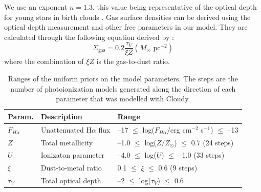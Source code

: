 \documentclass[fleqn,usenatbib]{mnras}
\begin{document}
We use an exponent $n = 1.3$, this value being representative of the optical depth for young stars in birth clouds \citep{dacunha2008}. Gas surface densities can be derived using the optical depth measurement and other free parameters in our model. They are calculated through the following equation derived by \cite{brinchmann2013}: 
\begin{equation}
    \label{eq:gas_equation_brinchmann}
    \Sigma_{\textrm{gas}} = 0.2 \frac{\tau_{V}}{\xi Z} (M_{\odot}\textrm{ pc}^{-2})
\end{equation}
where the combination of $\xi Z$ is the gas-to-dust ratio.
\begin{table}
 \centering
 \caption{Ranges of the uniform priors on the model parameters. The steps are the number of photoionization models generated along the direction of each parameter that was modelled with Cloudy.}
 \label{tab:model_priors}
\begin{tabularx}{\columnwidth}{lll}
\hline
\hline
\textbf{Param.} & \textbf{Description}            & \textbf{Range}                                \\ \hline
$F_{H\alpha}$      & Unattenuated H$\alpha$ flux     & --17 $\leq$ log($F_{H\alpha}/$erg cm$^{-2}$ s$^{-1}$) $\leq$ --13       \\
$Z$                & Total metallicity               & --1.0 $\leq$ log($Z/Z_{\odot}$) $\leq$ 0.7 (24 steps)   \\
$U$                & Ionizaton parameter             & --4.0 $\leq$ log($U$) $\leq$ --1.0 (33 steps) \\
$\xi$              & Dust-to-metal ratio             & 0.1 $\leq$ $\xi$ $\leq$ 0.6 (9 steps)         \\
$\tau_{V}$         & Total optical depth             & --2 $\leq$ log($\tau_{V}$) $\leq$ 0.6             \\
\hline
\end{tabularx}
\end{table}
\end{document}
